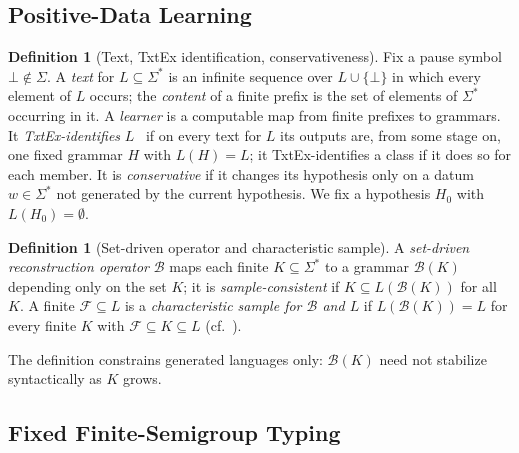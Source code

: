\documentclass[11pt]{article}
\numberwithin{equation}{section}
\theoremstyle{plain}
\theoremstyle{definition}
\newtheorem{definition}[theorem]{Definition}
\theoremstyle{remark}
\newcommand{\pausesym}{\bot}
\theoremstyle{plain}
\begin{document}
\subsection{Positive-Data Learning}

\begin{definition}[Text, TxtEx identification, conservativeness]
Fix a pause symbol $\pausesym\notin\Sigma$.  A \emph{text} for
$L\subseteq\Sigma^*$ is an infinite sequence over $L\cup\{\pausesym\}$ in which
every element of $L$ occurs; the \emph{content} of a finite prefix is the set
of elements of $\Sigma^*$ occurring in it.  A \emph{learner} is a computable map
from finite prefixes to grammars.  It \emph{TxtEx-identifies} $L$~\cite{Gold1967}
if on every text for $L$ its outputs are, from some stage on, one fixed grammar
$H$ with $L(H)=L$; it TxtEx-identifies a class if it does so for each member.
It is \emph{conservative} if it changes its hypothesis only on a datum
$w\in\Sigma^*$ not generated by the current hypothesis.  We fix a hypothesis
$H_0$ with $L(H_0)=\emptyset$.
\end{definition}

\begin{definition}[Set-driven operator and characteristic sample]
\label{def:characteristic-sample}
A \emph{set-driven reconstruction operator} $\mathcal B$ maps each finite
$K\subseteq\Sigma^*$ to a grammar $\mathcal B(K)$ depending only on the set
$K$; it is \emph{sample-consistent} if $K\subseteq L(\mathcal B(K))$ for all
$K$.  A finite $\mathcal F\subseteq L$ is a \emph{characteristic sample for
$\mathcal B$ and $L$} if $L(\mathcal B(K))=L$ for every finite $K$ with
$\mathcal F\subseteq K\subseteq L$ (cf.~\cite{deLaHiguera1997}).
\end{definition}

The definition constrains generated languages only: $\mathcal B(K)$ need not
stabilize syntactically as $K$ grows.

\subsection{Fixed Finite-Semigroup Typing}
\label{subsec:semigroup-typing}
\end{document}
